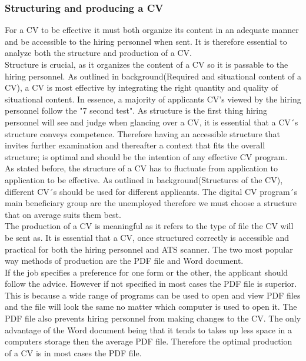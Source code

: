 \subsubsection{Structuring and producing a CV}
For a CV to be effective it must both organize its content in an adequate manner and be accessible to the hiring personnel when sent.
It is therefore essential to analyze both the structure and production of a CV. \\

Structure is crucial, as it organizes the content of a CV so it is passable to the hiring personnel.
As outlined in background(Required and situational content of a CV), a CV is most effective by integrating the right quantity and quality of situational content.
In essence, a majority of applicants CV's viewed by the hiring personnel follow the "7 second test".
As structure is the first thing hiring personnel will see and judge when glancing over a CV, it is essential that a CV´s structure conveys competence.
Therefore having an accessible structure that invites further examination and thereafter a context that fits the overall structure;
is optimal and should be the intention of any effective CV program. \\

As stated before, the structure of a CV has to fluctuate from application to application to be effective.
As outlined in background(Structures of the CV), different CV´s should be used for different applicants.
The digital CV program´s main beneficiary group are the unemployed therefore we must choose a structure that on average suits them best. \\

The production of a CV is meaningful as it refers to the type of file the CV will be sent as.
It is essential that a CV, once structured correctly is accessible and practical for both the hiring personnel and ATS scanner.
The two most popular way methods of production are the PDF file and Word document. \\

If the job specifies a preference for one form or the other, the applicant should follow the advice.
However if not specified in most cases the PDF file is superior.
This is because a wide range of programs can be used to open and view PDF files and the file will look the same no matter which computer is used to open it.
The PDF file also prevents hiring personnel from making changes to the CV. 
The only advantage of the Word document being that it tends to takes up less space in a computers storage then the average PDF file.
Therefore the optimal production of a CV is in most cases the PDF file. \\

